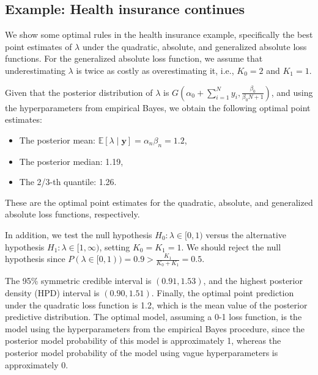 \subsection{Example: Health insurance continues}\label{131}

We show some optimal rules in the health insurance example, specifically the best point estimates of $\lambda$ under the quadratic, absolute, and generalized absolute loss functions. For the generalized absolute loss function, we assume that underestimating $\lambda$ is twice as costly as overestimating it, i.e., $K_0 = 2$ and $K_1 = 1$.

Given that the posterior distribution of $\lambda$ is $G(\alpha_0 + \sum_{i=1}^N y_i, \frac{\beta_0}{\beta_0 N + 1})$, and using the hyperparameters from empirical Bayes, we obtain the following optimal point estimates:
\begin{itemize}
	\item The posterior mean: $\mathbb{E}[\lambda \mid \mathbf{y}] = \alpha_n \beta_n = 1.2$,
	\item The posterior median: 1.19,
	\item The 2/3-th quantile: 1.26.
\end{itemize}
These are the optimal point estimates for the quadratic, absolute, and generalized absolute loss functions, respectively.

In addition, we test the null hypothesis $H_0: \lambda \in [0, 1)$ versus the alternative hypothesis $H_1: \lambda \in [1, \infty)$, setting $K_0 = K_1 = 1$. We should reject the null hypothesis since $P(\lambda \in [0, 1)) = 0.9 > \frac{K_1}{K_0 + K_1} = 0.5$.

The 95\% symmetric credible interval is $(0.91, 1.53)$, and the highest posterior density (HPD) interval is $(0.90, 1.51)$. Finally, the optimal point prediction under the quadratic loss function is 1.2, which is the mean value of the posterior predictive distribution. The optimal model, assuming a 0-1 loss function, is the model using the hyperparameters from the empirical Bayes procedure, since the posterior model probability of this model is approximately 1, whereas the posterior model probability of the model using vague hyperparameters is approximately 0.

